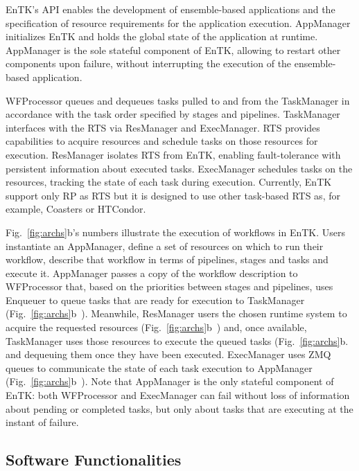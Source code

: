 \documentclass[preprint,12pt, a4paper]{elsarticle}
\begin{document}
EnTK's API enables the development of ensemble-based applications
and the specification of resource requirements for the application execution.
AppManager initializes EnTK and holds the global state of the application at
runtime. AppManager is the sole stateful component of EnTK, allowing to restart
other components upon failure, without interrupting the execution of the
ensemble-based application.

WFProcessor queues and dequeues tasks pulled to and from the TaskManager in
accordance with the task order specified by stages and pipelines. TaskManager
interfaces with the RTS via ResManager and ExecManager. RTS provides
capabilities to acquire resources and schedule tasks on those resources for
execution. ResManager isolates RTS from EnTK, enabling fault-tolerance with
persistent information about executed tasks. ExecManager schedules tasks on
the resources, tracking the state of each task during execution. Currently,
EnTK support only RP as RTS but it is designed to use other task-based RTS
as, for example, Coasters or HTCondor.

Fig.~\ref{fig:archs}b's numbers illustrate the execution of workflows in
EnTK\@. Users instantiate an AppManager, %
define a set of resources on which to run their workflow,
describe that workflow in terms of pipelines, stages and tasks
and execute it.
AppManager passes a copy of the workflow description to WFProcessor that, based
on the priorities between stages and pipelines, uses Enqueuer to queue tasks
that are ready for execution to TaskManager (Fig.~\ref{fig:archs}b~).
Meanwhile, ResManager users the chosen runtime system to acquire the requested
resources (Fig.~\ref{fig:archs}b~) and, once available, TaskManager
uses those resources to execute the queued tasks
(Fig.~\ref{fig:archs}b.~ and dequeuing them once they have been
executed. ExecManager uses ZMQ queues to communicate the state of each task
execution to AppManager (Fig.~\ref{fig:archs}b~). Note that
AppManager is the only stateful component of EnTK\@: both WFProcessor and
ExecManager can fail without loss of information about pending or completed
tasks, but only about tasks that are executing at the instant of failure.

\subsection{Software Functionalities}\label{ssec:functionalities}
\end{document}
